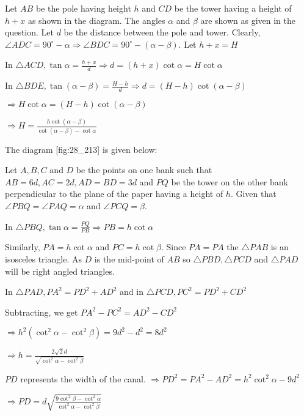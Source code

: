   Let $AB$ be the pole having height $h$ and $CD$ be the tower having a height of
  $h + x$ as shown in the diagram. The angles $\alpha$ and $\beta$ are shown as given
  in the question. Let $d$ be the distance between the pole and tower. Clearly, $\angle ADC =
  90^\circ - \alpha \Rightarrow \angle BDC = 90^\circ - (\alpha - \beta)$. Let $h + x = H$

  In $\triangle ACD, \tan\alpha = \frac{h + x}{d} \Rightarrow d = (h + x)\cot\alpha = H\cot\alpha$

  In $\triangle BDE, \tan(\alpha - \beta) = \frac{H - h}{d} \Rightarrow d = (H - h)\cot(\alpha -
  \beta)$

  $\Rightarrow H\cot\alpha = (H - h)\cot(\alpha - \beta)$

  $\Rightarrow H = \frac{h\cot(\alpha - \beta)}{\cot(\alpha- \beta) - \cot\alpha}$

\item The diagram [fig:28_213] is given below:

  \startplacefigure[reference=fig:28_213]
    \externalfigure[28_213.pdf]
  \stopplacefigure

  Let $A, B, C$ and $D$ be the points on one bank such that $AB = 6d, AC = 2d, AD = BD
  = 3d$ and $PQ$ be the tower on the other bank perpendicular to the plane of the paper having a
  height of $h$. Given that $\angle PBQ = \angle PAQ = \alpha$ and $\angle PCQ =
  \beta$.

  In $\triangle PBQ, \tan\alpha = \frac{PQ}{PB} \Rightarrow PB = h\cot\alpha$

  Similarly, $PA = h\cot\alpha$ and $PC = h\cot\beta$. Since $PA = PA$ the
  $\triangle PAB$ is an isosceles triangle. As $D$ is the mid-point of $AB$ so
  $\triangle PBD, \triangle PCD$ and $\triangle PAD$ will be right angled triangles.

  In $\triangle PAD, PA^2 = PD^2 + AD^2$ and in $\triangle PCD, PC^2 = PD^2 + CD^2$

  Subtracting, we get $PA^2 - PC^2 = AD^2 - CD^2$

  $\Rightarrow h^2(\cot^2\alpha - \cot^2\beta) = 9d^2 - d^2 = 8d^2$

  $\Rightarrow h = \frac{2\sqrt{2}d}{\sqrt{\cot^2\alpha - \cot^2\beta}}$

  $PD$ represents the width of the canal. $\Rightarrow PD^2 = PA^2 - AD^2 = h^2\cot^2\alpha -
  9d^2$

  $\Rightarrow PD = d\sqrt{\frac{9\cot^2\beta - \cot^2\alpha}{\cot^2\alpha - \cot^2\beta}}$

